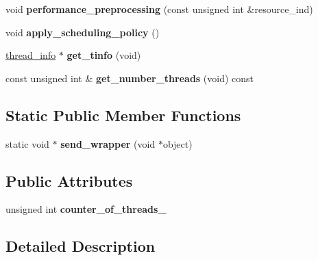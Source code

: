 \begin{DoxyCompactItemize}
\item 
\hypertarget{classScheduler_a2e8eeafda5ee215213d1a8ad076e86e7}{void {\bfseries performance\-\_\-preprocessing} (const unsigned int \&resource\-\_\-ind)}\label{classScheduler_a2e8eeafda5ee215213d1a8ad076e86e7}

\item 
\hypertarget{classScheduler_a782dd674fc65f8f96bbcdad24e48b75e}{void {\bfseries apply\-\_\-scheduling\-\_\-policy} ()}\label{classScheduler_a782dd674fc65f8f96bbcdad24e48b75e}

\item 
\hypertarget{classScheduler_a9e0189d3b9815eac90901ba171722525}{\hyperlink{structthread__info}{thread\-\_\-info} $\ast$ {\bfseries get\-\_\-tinfo} (void)}\label{classScheduler_a9e0189d3b9815eac90901ba171722525}

\item 
\hypertarget{classScheduler_ab640e06ed98152a9acd8cf032b7ad455}{const unsigned int \& {\bfseries get\-\_\-number\-\_\-threads} (void) const }\label{classScheduler_ab640e06ed98152a9acd8cf032b7ad455}

\end{DoxyCompactItemize}
\subsection*{Static Public Member Functions}
\begin{DoxyCompactItemize}
\item 
\hypertarget{classScheduler_adc23bd3b2f1babde08ce237c8f43cc19}{static void $\ast$ {\bfseries send\-\_\-wrapper} (void $\ast$object)}\label{classScheduler_adc23bd3b2f1babde08ce237c8f43cc19}

\end{DoxyCompactItemize}
\subsection*{Public Attributes}
\begin{DoxyCompactItemize}
\item 
\hypertarget{classScheduler_a991ae0f798df9ce56116d5c66f615c9f}{unsigned int {\bfseries counter\-\_\-of\-\_\-threads\-\_\-}}\label{classScheduler_a991ae0f798df9ce56116d5c66f615c9f}

\end{DoxyCompactItemize}


\subsection{Detailed Description}


